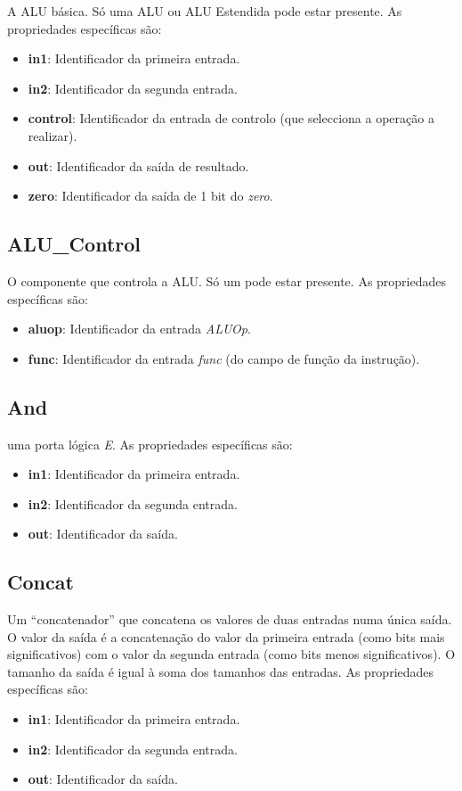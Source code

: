 \documentclass[11pt,a4paper,twoside,titlepage]{report}
\begin{document}
A ALU básica. Só uma ALU ou ALU Estendida pode estar presente. As propriedades
específicas são:
\begin{itemize}
	\item \textbf{in1}: Identificador da primeira entrada.
	\item \textbf{in2}: Identificador da segunda entrada.
	\item \textbf{control}: Identificador da entrada de controlo (que selecciona
		a operação a realizar).
	\item \textbf{out}: Identificador da saída de resultado.
	\item \textbf{zero}: Identificador da saída de 1 bit do \emph{zero}.
\end{itemize}

\subsection{ALU\_Control}

O componente que controla a ALU. Só um pode estar presente.
As propriedades específicas são:
\begin{itemize}
	\item \textbf{aluop}: Identificador da entrada \emph{ALUOp}.
	\item \textbf{func}: Identificador da entrada \emph{func} (do campo de função
		da instrução).
\end{itemize}

\subsection{And}

uma porta lógica \emph{E}. As propriedades específicas são:
\begin{itemize}
	\item \textbf{in1}: Identificador da primeira entrada.
	\item \textbf{in2}: Identificador da segunda entrada.
	\item \textbf{out}: Identificador da saída.
\end{itemize}

\subsection{Concat}

Um ``concatenador'' que concatena os valores de duas entradas numa única saída.
O valor da saída é a concatenação do valor da primeira entrada (como bits mais
significativos) com o valor da segunda entrada (como bits menos significativos).
O tamanho da saída é igual à soma dos tamanhos das entradas.
As propriedades específicas são:
\begin{itemize}
	\item \textbf{in1}: Identificador da primeira entrada.
	\item \textbf{in2}: Identificador da segunda entrada.
	\item \textbf{out}: Identificador da saída.
\end{itemize}
\end{document}

